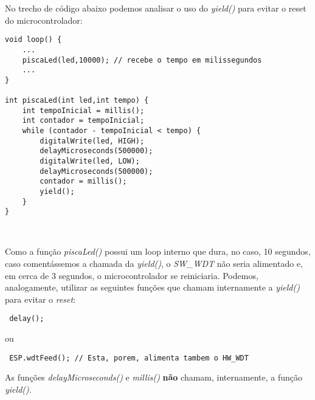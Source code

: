 \documentclass[
	11pt,				%
	openright,			%
	twoside,			%
	a5paper,			%
	english,			%
	french,				%
	spanish,			%
	brazil,				%
	sumario=tradicional
]{abntex2}
\begin{document}
\begin{tcolorbox}[colbacktitle=green!50!white!60,
title={\vspace{-13pt}\texttt{[image: notebook.png]} \hspace{2pt} \textsf{\textbf{Na Prática...}\vspace{4pt}}},coltitle=black, colback=white,arc=4mm, outer arc=3.5mm]
\raggedright
No trecho de código abaixo podemos analisar o uso do \emph{yield()} para evitar o reset do microcontrolador:
       \begin{lstlisting} 
void loop() {
    ...
    piscaLed(led,10000); // recebe o tempo em milissegundos
    ...
}
    
int piscaLed(int led,int tempo) {
    int tempoInicial = millis();
    int contador = tempoInicial;
    while (contador - tempoInicial < tempo) {
        digitalWrite(led, HIGH);
        delayMicroseconds(500000);
        digitalWrite(led, LOW);
        delayMicroseconds(500000);
        contador = millis();
        yield();
    }
}
    
    
\end{lstlisting}

Como a função \emph{piscaLed()} possui um loop interno que dura, no caso, 10 segundos, caso comentássemos a chamada da \emph{yield()}, o \emph{SW\_WDT} não seria alimentado e, em cerca de 3 segundos, o microcontrolador se reiniciaria. Podemos, analogamente, utilizar as seguintes funções que chamam internamente a \emph{yield()} para evitar o \textit{reset}:

\begin{lstlisting}
 delay();
 \end{lstlisting}
 ou
 \begin{lstlisting}
 ESP.wdtFeed(); // Esta, porem, alimenta tambem o HW_WDT
 \end{lstlisting}

\end{tcolorbox}

\begin{tcolorbox}[colbacktitle=yellow!60!white,
title={\vspace{-13pt}\texttt{[image: exclamacao.png]} \hspace{2pt} \textsf{\textbf{ATENÇÃO!}\vspace{2pt}}},coltitle=black, colback=white,arc=4mm, outer arc=3.5mm]
\raggedright
 As funções \emph{delayMicroseconds()} e \emph{millis()} \textsf{\textbf{não}} chamam, internamente, a função \emph{yield().}
\end{tcolorbox}
\end{document}

